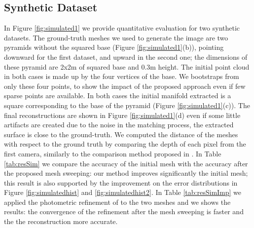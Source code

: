\subsection{Synthetic Dataset}
In Figure \ref{fig:simulated1} we provide quantitative evaluation for two synthetic datasets.
The ground-truth meshes we used to generate the image are two pyramids without the squared base (Figure \ref{fig:simulated1}(b)), pointing downward for the first dataset, and upward in the second one; the dimensions of these pyramid are 2x2m of squared base and 0.3m height.
The initial point cloud in both cases is made up by the four vertices of the base. 
We bootstraps from only these four points, to show the impact of the proposed approach even if few sparse points are available.
In both cases the initial manifold extracted is a square corresponding to the base of the pyramid (Figure \ref{fig:simulated1}(c)).
The final reconstructions are shown in Figure \ref{fig:simulated1}(d) even if some little artifacts are created due to the noise in the matching process, the extracted surface is close to the ground-truth.
We computed the distance of the meshes with respect to the ground truth by comparing the depth of each pixel from the first camera, similarly to the comparison method proposed in \cite{strecha2008}. 
In Table \ref{tab:resSim} we compare the accuracy of the initial mesh with the accuracy after the proposed mesh sweeping: our method improves significantly the initial mesh; this result is also supported by the improvement on the error distributions in  Figure \ref{fig:simulatedhist} and \ref{fig:simulatedhist2}.
In Table \ref{tab:resSimImp} we applied the photometric refinement of \cite{vu_et_al_2012} to the two meshes and we shows the results: the convergence of the refinement after the mesh sweeping is faster and the the reconstruction more accurate.


